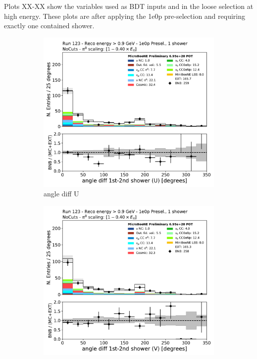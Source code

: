 
Plots XX-XX show the variables used as BDT inputs and in the loose selection at high energy. These plots are after applying the 1e0p pre-selection and requiring exactly one contained shower.
\begin{figure}[H]
    \centering
    \begin{subfigure}{0.3\textwidth}
    \includegraphics[width=1.0\textwidth]{1e0p/High_E_Sideband/anglediff_U.pdf}
    \caption{angle diff U}
    \end{subfigure}
    \begin{subfigure}{0.3\textwidth}
    \includegraphics[width=1.0\textwidth]{1e0p/High_E_Sideband/anglediff_V.pdf}

\end{subfigure}
\end{figure}
